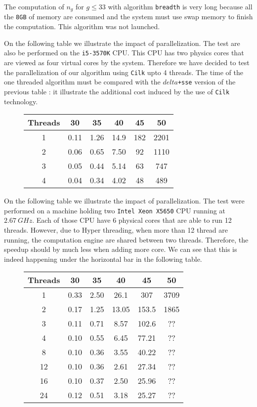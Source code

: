 \documentclass[reqno,11pt]{amsart}
\theoremstyle{plain}
\theoremstyle{definition}
\newcommand{\Cilk}{\texttt{Cilk}\xspace}
\renewcommand{\leq}{\leqslant}
\renewcommand{\tt}[1]{\texttt{#1}}
\newcommand{\Jean}[1]{{\color{blue}#1}}
\begin{document}
The computation of $n_g$ for $g\leq 33$ with algorithm \texttt{breadth} is very long because all the \texttt{8GB} of memory are consumed and the system must use swap memory to finish the computation. This algorithm was not launched.

\Jean{
On the following table we illustrate the impact of parallelization. The test are also be performed on the \tt{i5-3570K} CPU. This CPU has two physics cores that are viewed as four virtual cores by the system. Therefore we have decided to test the parallelization of our algorithm using \Cilk upto 4 threads. 
The time of the one threaded algorithm  must be compared with the \texttt{$delta$+sse} version of the previous table : it illustrate the additional cost induced by the use of \Cilk technology. 
  
  \begin{figure}[h!]
\begin{tabular}{|c|c|c|c|c|c|}
\hline
Threads & 30 & 35 & 40 & 45 & 50 \\
\hline
1 &  0.11 & 1.26 & 14.9 & 182 & 2201 \\ 
2 &  0.06 & 0.65 & 7.50 &  92 & 1110\\
3 &  0.05 & 0.44 & 5.14 &  63 & 747 \\
4 &  0.04 & 0.34 & 4.02 &  48 & 489 \\
\hline
\end{tabular}
\end{figure}
}

On the following table we illustrate the impact of parallelization. The test
were performed on a machine holding two \tt{Intel\texttrademark{}
  Xeon\texttrademark{} X5650} CPU running at $2.67~GHz$. Each of those CPU
have 6 physical cores that are able to run 12 threads. However, due to Hyper
threading, when more than 12 thread are running, the computation engine are
shared between two threads. Therefore, the speedup should by much less when
adding more core. We can see that this is indeed happening under the
horizontal bar in the following table.
  \begin{figure}[h!]
\begin{tabular}{|c|c|c|c|c|c|}
\hline
Threads & 30 & 35 & 40 & 45 & 50 \\
\hline
1 &  0.33 & 2.50 & 26.1 & 307 & 3709 \\
2 &  0.17 & 1.25 & 13.05 & 153.5 & 1865\\
3 &  0.11 & 0.71 & 8.57 & 102.6 & ?? \\
4 &  0.10 & 0.55 & 6.45 &  77.21 & ?? \\
8 &  0.10 & 0.36 & 3.55 &  40.22 & ?? \\
12 &  0.10 & 0.36 & 2.61 & 27.34 & ?? \\\hline
16 &  0.10 & 0.37 & 2.50 & 25.96 & ?? \\
24 &  0.12 & 0.51 & 3.18 & 25.27 & ?? \\
\hline
\end{tabular}
\end{figure}
\end{document}
